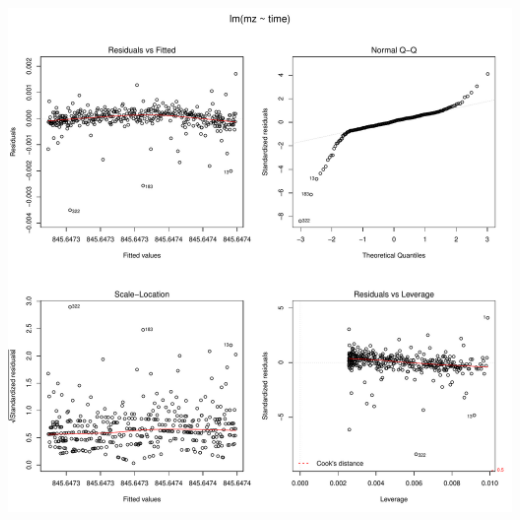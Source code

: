 \documentclass[]{article}
\begin{document}
\includegraphics{Supplementary_document_files/figure-latex/fit.lin.845-1.pdf}
\end{document}
